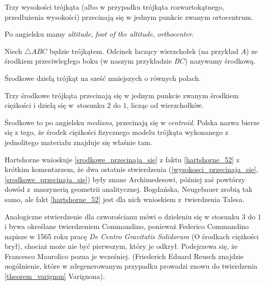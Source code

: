 
\begin{proposition}
\label{wysokosci_przecinaja_sie}%
	Trzy wysokości trójkąta (albo w przypadku trójkąta rozwartokątnego, przedłużenia wysokości) przecinają się w jednym punkcie zwanym ortocentrum.
\end{proposition}

Po angielsku mamy \emph{altitude}, \emph{foot of the altitude}, \emph{orthocenter}.

\begin{definition}[środkowa]
%
    Niech $\triangle ABC$ będzie trójkątem.
    Odcinek łaczący wierzchołek (na przykład $A$) ze środkiem przeciwległego boku (w naszym przykładzie $BC$) nazywamy środkową.
\end{definition}

Środkowe dzielą trójkąt na sześć mniejszych o równych polach.

\begin{proposition}
\label{srodkowe_przecinaja_sie}%
%
    Trzy środkowe trójkąta przecinają się w jednym punkcie zwanym środkiem ciężkości i dzielą się w~stosunku $2$ do $1$, licząc od wierzchołków.
\end{proposition}

Środkowe to po angielsku \emph{medians}, przecinają się w \emph{centroid}.
Polska nazwa bierze się z tego, że środek ciężkości fizycznego modelu trójkąta wykonanego z jednolitego materiału znajduje się właśnie tam.

Hartshorne \cite[s. 52-54]{hartshorne2000} wnioskuje \ref{srodkowe_przecinaja_sie} z faktu \ref{hartshorne_52} z krótkim komentarzem, że dwa ostatnie stwierdzenia (\ref{wysokosci_przecinaja_sie}, \ref{srodkowe_przecinaja_sie}) były znane Archimedesowi, później zaś \cite[s. 119-120]{hartshorne2000} powtórzy dowód z~maszynerią geometrii analitycznej.
%
Bogdańska, Neugebauer zrobią tak samo, ale fakt \ref{hartshorne_52} jest dla nich wnioskiem z~twierdzenia Talesa.
%

Analogiczne stwierdzenie dla czworościanu mówi o dzieleniu się w stosunku $3$ do $1$ i bywa określane twierdzeniem Commandino, ponieważ Federico Commandino napisze w 1565 roku pracę \emph{De Centro Gravitatis Solidorum} (O środkach ciężkości brył), chociaż może nie być pierwszym, który je odkrył.
%
%
Podejrzewa się, że Francesco Maurolico pozna je wcześniej.
(Friederich Eduard Reusch znajdzie uogólnienie, które w zdegenerowanym przypadku prowadzi znowu do twierdzenia \ref{theorem_varignon} Varignona).